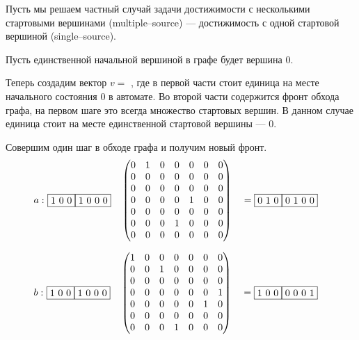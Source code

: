 \begin{example}
Пусть мы решаем частный случай задачи достижимости с несколькими стартовыми вершинами (multiple--source) 
--- достижимость с одной стартовой вершиной (single--source).

Пусть единственной начальной вершиной в графе будет вершина $0$.

Теперь создадим вектор $v = $  , где в первой части стоит единица на месте начального состояния $0$ в автомате. 
Во второй части содержится фронт обхода графа, на первом шаге это всегда множество стартовых вершин. В данном случае единица стоит на месте
единственной стартовой вершины --- $0$.

Совершим один шаг в обходе графа и получим новый фронт.
\begin{alignat*}{7}
  a:\,\,
  & \begin{matrix}
    \fbox{1 0 0} \fbox{1 0 0 0}
    \end{matrix}  && \begin{pmatrix}
      0 & 1 & 0 & 0 & 0 & 0 & 0 \\
      0 & 0 & 0 & 0 & 0 & 0 & 0 \\
      0 & 0 & 0 & 0 & 0 & 0 & 0 \\
      0 & 0 & 0 & 0 & 1 & 0 & 0 \\
      0 & 0 & 0 & 0 & 0 & 0 & 0 \\
      0 & 0 & 0 & 1 & 0 & 0 & 0 \\
      0 & 0 & 0 & 0 & 0 & 0 & 0  
      \end{pmatrix} &&= \begin{matrix}
        \fbox{0 1 0} \fbox{0 1 0 0} 
    \end{matrix}
\end{alignat*}

\begin{alignat*}{7}
  b:\,\,
  & \begin{matrix}
    \fbox{1 0 0} \fbox{1 0 0 0}
    \end{matrix}  && \begin{pmatrix}
      1 & 0 & 0 & 0 & 0 & 0 & 0 \\
      0 & 0 & 1 & 0 & 0 & 0 & 0 \\
      0 & 0 & 0 & 0 & 0 & 0 & 0 \\
      0 & 0 & 0 & 0 & 0 & 0 & 1 \\
      0 & 0 & 0 & 0 & 0 & 1 & 0 \\
      0 & 0 & 0 & 0 & 0 & 0 & 0 \\
      0 & 0 & 0 & 1 & 0 & 0 & 0 
      \end{pmatrix} &&= \begin{matrix}
        \fbox{1 0 0} \fbox{0 0 0 1}
    \end{matrix}
\end{alignat*}


\end{example}
